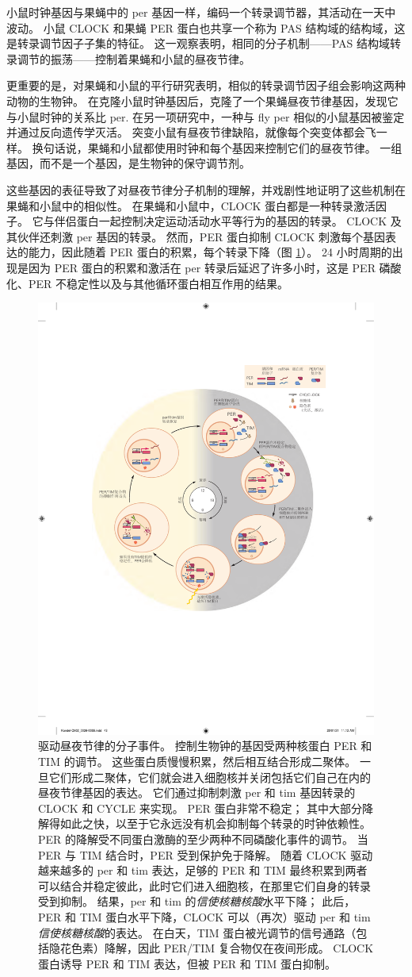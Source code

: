小鼠时钟基因与果蝇中的 per 基因一样，编码一个转录调节器，其活动在一天中波动。 
小鼠 CLOCK 和果蝇 PER 蛋白也共享一个称为 PAS 结构域的结构域，这是转录调节因子子集的特征。 
这一观察表明，相同的分子机制——PAS 结构域转录调节的振荡——控制着果蝇和小鼠的昼夜节律。


更重要的是，对果蝇和小鼠的平行研究表明，相似的转录调节因子组会影响这两种动物的生物钟。 
在克隆小鼠时钟基因后，克隆了一个果蝇昼夜节律基因，发现它与小鼠时钟的关系比 per. 在另一项研究中，一种与 fly per 相似的小鼠基因被鉴定并通过反向遗传学灭活。 
突变小鼠有昼夜节律缺陷，就像每个突变体都会飞一样。 
换句话说，果蝇和小鼠都使用时钟和每个基因来控制它们的昼夜节律。 
一组基因，而不是一个基因，是生物钟的保守调节剂。


这些基因的表征导致了对昼夜节律分子机制的理解，并戏剧性地证明了这些机制在果蝇和小鼠中的相似性。 
在果蝇和小鼠中，CLOCK 蛋白都是一种转录激活因子。 
它与伴侣蛋白一起控制决定运动活动水平等行为的基因的转录。 
CLOCK 及其伙伴还刺激 per 基因的转录。 
然而，PER 蛋白抑制 CLOCK 刺激每个基因表达的能力，因此随着 PER 蛋白的积累，每个转录下降（图 \ref{fig:2_13}）。 
24 小时周期的出现是因为 PER 蛋白的积累和激活在 per 转录后延迟了许多小时，这是 PER 磷酸化、PER 不稳定性以及与其他循环蛋白相互作用的结果。

\begin{figure}[htbp]
	\centering
	\includegraphics[width=0.5\linewidth]{chap02/fig_2_13}
	\caption{驱动昼夜节律的分子事件。 
		控制生物钟的基因受两种核蛋白 PER 和 TIM 的调节。 
		这些蛋白质慢慢积累，然后相互结合形成二聚体。 
		一旦它们形成二聚体，它们就会进入细胞核并关闭包括它们自己在内的昼夜节律基因的表达。 
		它们通过抑制刺激 per 和 tim 基因转录的 CLOCK 和 CYCLE 来实现。 
		PER 蛋白非常不稳定； 其中大部分降解得如此之快，以至于它永远没有机会抑制每个转录的时钟依赖性。 
		PER 的降解受不同蛋白激酶的至少两种不同磷酸化事件的调节。 
		当 PER 与 TIM 结合时，PER 受到保护免于降解。 
		随着 CLOCK 驱动越来越多的 per 和 tim 表达，足够的 PER 和 TIM 最终积累到两者可以结合并稳定彼此，此时它们进入细胞核，在那里它们自身的转录受到抑制。 
		结果，per 和 tim 的\textit{信使核糖核酸}水平下降； 此后，PER 和 TIM 蛋白水平下降，CLOCK 可以（再次）驱动 per 和 tim \textit{信使核糖核酸}的表达。 
		在白天，TIM 蛋白被光调节的信号通路（包括隐花色素）降解，因此 PER/TIM 复合物仅在夜间形成。 
		CLOCK 蛋白诱导 PER 和 TIM 表达，但被 PER 和 TIM 蛋白抑制。}
	\label{fig:2_13}
\end{figure}


